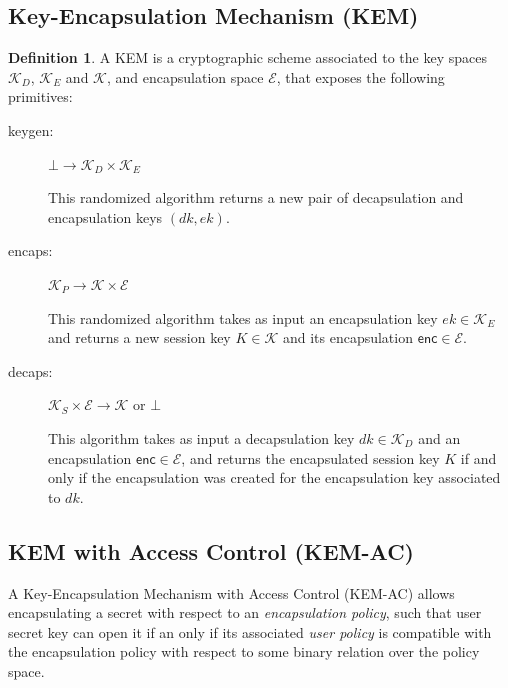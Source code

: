 \documentclass[a4paper]{article}
\theoremstyle{definition}
\newtheorem{definition}{Definition}[section]
\newcommand{\sfenc}{\mathsf{enc}}
\newcommand{\cE}{\mathcal{E}}
\newcommand{\cK}{\mathcal{K}}
\begin{document}
\subsection{Key-Encapsulation Mechanism (KEM)}
\label{sec:org1ff3c7f}

\begin{definition}
A KEM  is a cryptographic scheme  associated to the key  spaces \(\cK_D\), \(\cK_E\)
and \(\cK\), and encapsulation space \(\cE\), that exposes the following primitives:
\begin{description}
\item[{keygen:}] \(\bot \rightarrow \cK_D \times \cK_E\)

This  randomized   algorithm  returns   a  new   pair  of   decapsulation  and
encapsulation keys \((dk, ek)\).

\item[{encaps:}] \(\cK_P \rightarrow \cK \times \cE\)

This randomized algorithm  takes as input an encapsulation key  \(ek \in \cK_E\)
and returns a  new session key \(K  \in \cK\) and its  encapsulation \(\sfenc \in
  \cE\).

\item[{decaps:}] \(\cK_S \times \cE \rightarrow \cK\) or \(\bot\)

This  algorithm takes  as input  a  decapsulation key  \(dk \in  \cK_D\) and  an
encapsulation \(\sfenc \in  \cE\), and returns the encapsulated  session key \(K\)
if  and only  if  the  encapsulation was  created  for  the encapsulation  key
associated to \(dk\).
\end{description}
\end{definition}
\subsection{KEM with Access Control (KEM-AC)}
\label{sec:org4002894}

A Key-Encapsulation Mechanism with  Access Control (KEM-AC) allows encapsulating
a secret  with respect to an  \emph{encapsulation policy}, such that  user secret key
can open it  if an only if  its associated \emph{user policy} is  compatible with the
encapsulation policy with respect to some binary relation over the policy space.
\end{document}
